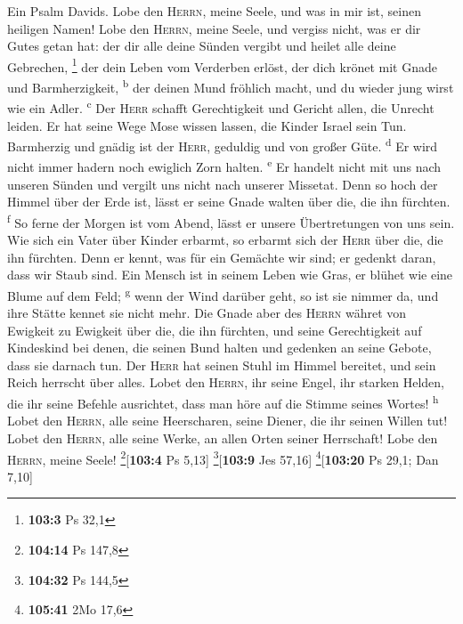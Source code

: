  Ein Psalm Davids. Lobe den \textsc{Herrn}, meine Seele,
und was in mir ist, seinen heiligen Namen!  Lobe den
\textsc{Herrn}, meine Seele, und vergiss nicht, was er dir Gutes getan
hat:  der dir alle deine Sünden vergibt und heilet alle
deine Gebrechen, \footnote{\textbf{103:3} Ps 32,1}  der
dein Leben vom Verderben erlöst, der dich krönet mit Gnade und
Barmherzigkeit, \textsuperscript{b}  der deinen Mund
fröhlich macht, und du wieder jung wirst wie ein Adler.
\textsuperscript{c}  Der \textsc{Herr} schafft
Gerechtigkeit und Gericht allen, die Unrecht leiden.  Er
hat seine Wege Mose wissen lassen, die Kinder Israel sein Tun.
 Barmherzig und gnädig ist der \textsc{Herr}, geduldig und
von großer Güte. \textsuperscript{d}  Er wird nicht immer
hadern noch ewiglich Zorn halten. \textsuperscript{e}  Er
handelt nicht mit uns nach unseren Sünden und vergilt uns nicht nach
unserer Missetat.  Denn so hoch der Himmel über der Erde
ist, lässt er seine Gnade walten über die, die ihn fürchten.
\textsuperscript{f}  So ferne der Morgen ist vom Abend,
lässt er unsere Übertretungen von uns sein.  Wie sich ein
Vater über Kinder erbarmt, so erbarmt sich der \textsc{Herr} über die,
die ihn fürchten.  Denn er kennt, was für ein Gemächte
wir sind; er gedenkt daran, dass wir Staub sind.  Ein
Mensch ist in seinem Leben wie Gras, er blühet wie eine Blume auf dem
Feld; \textsuperscript{g}  wenn der Wind darüber geht, so
ist sie nimmer da, und ihre Stätte kennet sie nicht mehr.
 Die Gnade aber des \textsc{Herrn} währet von Ewigkeit zu
Ewigkeit über die, die ihn fürchten, und seine Gerechtigkeit auf
Kindeskind  bei denen, die seinen Bund halten und
gedenken an seine Gebote, dass sie darnach tun.  Der
\textsc{Herr} hat seinen Stuhl im Himmel bereitet, und sein Reich
herrscht über alles.  Lobet den \textsc{Herrn}, ihr seine
Engel, ihr starken Helden, die ihr seine Befehle ausrichtet, dass man
höre auf die Stimme seines Wortes! \textsuperscript{h} 
Lobet den \textsc{Herrn}, alle seine Heerscharen, seine Diener, die ihr
seinen Willen tut!  Lobet den \textsc{Herrn}, alle seine
Werke, an allen Orten seiner Herrschaft! Lobe den \textsc{Herrn}, meine
Seele! \footnote{\textbf{104:14} Ps 147,8}{[}\textbf{103:4} Ps 5,13{]}
\footnote{\textbf{104:32} Ps 144,5}{[}\textbf{103:9} Jes 57,16{]}
\footnote{\textbf{105:41} 2Mo 17,6}{[}\textbf{103:20} Ps 29,1; Dan
7,10{]}


